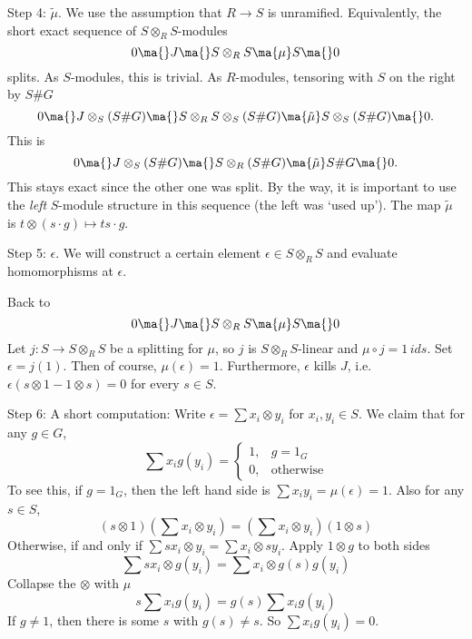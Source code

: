 Step 4: $\tilde{\mu}$. We use the assumption that $R \to S$ is unramified. Equivalently, the short exact sequence of $S \otimes_R S$-modules 
	\[
	0 \ma{} J \ma{} S \otimes_R S \ma{\mu} S \ma{} 0
	\]
splits. As $S$-modules, this is trivial. As $R$-modules, tensoring with $S$ on the right by $S\#G$
	\[
	0 \ma{} J \otimes_S (S\#G) \ma{} S \otimes_R S \otimes_S (S\#G) \ma{\tilde \mu} S \otimes_S  (S\#G) \ma{} 0.
	\]
This is
	\[
	0 \ma{} J \otimes_S (S\#G) \ma{} S \otimes_R (S\#G) \ma{\tilde{\mu}} S\#G \ma{} 0.
	\]
This stays exact since the other one was split. By the way, it is important to use the \emph{left} $S$-module structure in this sequence (the left was `used up'). The map $\tilde{\mu}$ is $t \otimes (s \cdot g) \mapsto ts \cdot g$. 


Step 5: $\epsilon$. We will construct a certain element $\epsilon \in S \otimes_R S$ and evaluate homomorphisms at $\epsilon$. 

Back to 
	\[
	0 \ma{} J \ma{} S \otimes_R S \ma{\mu} S \ma{} 0
	\]
Let $j: S \to S \otimes_R S$ be a splitting for $\mu$, so $j$ is $S \otimes_R S$-linear and $\mu \circ j= 1 \, ids$. Set $\epsilon= j(1)$. Then of course, $\mu(\epsilon)=1$. Furthermore, $\epsilon$ kills $J$, i.e. $\epsilon(s \otimes 1 - 1 \otimes s)=0$ for every $s \in S$. 


Step 6: A short computation: Write $\epsilon = \sum x_i \otimes y_i$ for $x_i,y_i \in S$. We claim that for any $g \in G$, 
	\[
	\sum x_i g(y_i) = 
	\begin{cases}
	1, & g= 1_G \\
	0, &  \text{otherwise}
	\end{cases}
	\]
To see this, if $g= 1_G$, then the left hand side is $\sum x_i y_i = \mu(\epsilon)=1$. Also for any $s \in S$,
	\[
	(s \otimes 1)( \sum x_i \otimes y_i) = (\sum x_i \otimes y_i)(1 \otimes s)
	\]
Otherwise,  if and only if $\sum s x_i \otimes y_i= \sum x_i \otimes sy_i$. Apply $1 \otimes g$ to both sides
	\[
	\sum sx_i \otimes g(y_i) = \sum x_i \otimes g(s) g(y_i)
	\]
Collapse the $\otimes$ with $\mu$ 
	\[
	s \sum x_i g(y_i) = g(s) \sum x_i g(y_i)
	\]
If $g \neq 1$, then there is some $s$ with $g(s) \neq s$. So $\sum x_i g(y_i)= 0$. 



